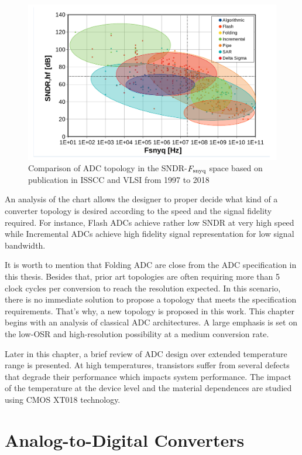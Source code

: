 \begin{figure}[htp]
	\centering
	\includegraphics[width=.8\textwidth]{Chapter2/Figs/Vector/sndr_fsnyq_topology.pdf}
	\caption{Comparison of ADC topology in the SNDR-$F_{\rm snyq}$ space based on publication in ISSCC and VLSI from 1997 to 2018}
	\label{fig:topology-sndr-fsnyq-comparison}
\end{figure}
An analysis of the chart allows the designer to proper decide what kind of a converter topology is desired according to the speed and the signal fidelity required. For instance, Flash ADCs achieve rather low SNDR at very high speed while Incremental ADCs achieve high fidelity signal representation for low signal bandwidth. 


It is worth to mention that Folding ADC are close from the ADC specification in this thesis. Besides that, prior art topologies are often requiring more than 5 clock cycles per conversion to reach the resolution expected. In this scenario, there is no immediate solution to propose a topology that meets the specification requirements. That's why, a new topology is proposed in this work. This chapter begins with an analysis of classical ADC architectures. A large emphasis is set on the low-OSR and high-resolution possibility at a medium conversion rate.

Later in this chapter, a brief review of ADC design over extended temperature range is presented. At high temperatures, transistors suffer from several defects that degrade their performance which impacts system performance. The impact of the temperature at the device level and the material dependences are studied using CMOS XT018 technology. 

\section{Analog-to-Digital Converters}
